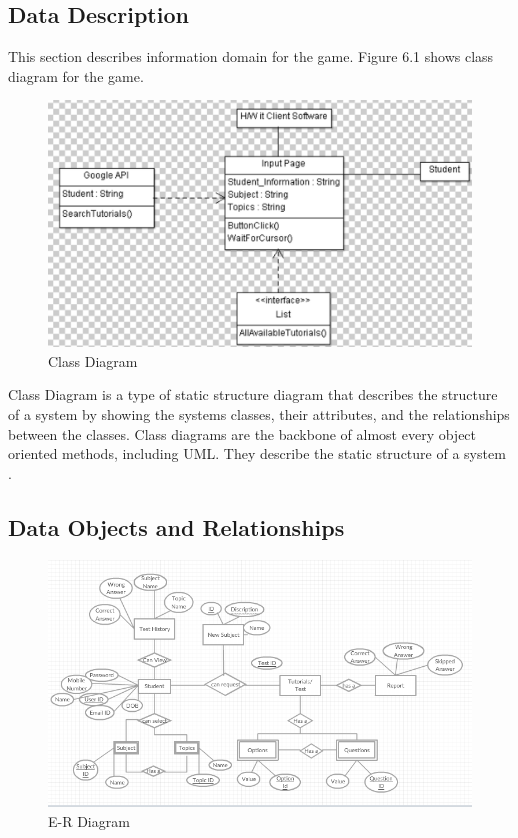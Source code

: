 \documentclass[oneside,a4paper,12pt]{report}
\begin{document}
\subsection{Data Description}
\hspace*{0.3in}This section describes information domain for the game. Figure 6.1 shows class diagram for the game.\\
\begin{figure}[h]
\centering
\includegraphics[height=6.0 cm,width=10.0 cm]{class.png}
\caption{Class Diagram}
\end{figure}
\hspace*{0.3in}Class Diagram is a type of static structure diagram that describes the structure of a system by showing the systems classes, their attributes, and the relationships between the classes. Class diagrams are the backbone of almost every object oriented methods, including UML. They describe the static structure of a system .
\subsection{Data Objects and Relationships}

\begin{figure}[h]
\centering
\includegraphics[height=7.0 cm,width=14.0 cm]{er.png}
\caption{E-R Diagram}
\end{figure}
\end{document}

